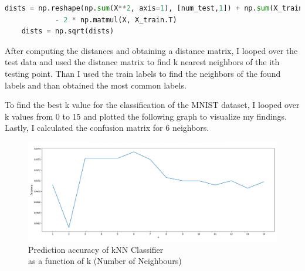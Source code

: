 \begin{lstlisting}[language=Python, caption=Computing the distances without
loops]
    dists = np.reshape(np.sum(X**2, axis=1), [num_test,1]) + np.sum(X_train**2, axis=1) \
            - 2 * np.matmul(X, X_train.T)
    dists = np.sqrt(dists)

\end{lstlisting}

After computing the distances and obtaining a distance matrix, I looped over the
test data and used the distance matrix to find k nearest neighbors of the ith
testing point. Than I used the train labels to find the neighbors of the found
labels and than obtained the most common labels.

To find the best k value for the classification of the MNIST dataset, I looped
over k values from 0 to 15 and plotted the following graph to visualize my
findings. Lastly, I calculated the confusion matrix for 6 neighbors.

\begin{figure}[H]
    \centering
    \includegraphics[width=\textwidth]{images/knn.png}
    \caption*{Prediction accuracy of kNN Classifier \\
    as a function of k (Number of Neighbours)}
    \setlength{\belowcaptionskip}{-20pt}
    \setlength{\abovecaptionskip}{-20pt}
\end{figure}


